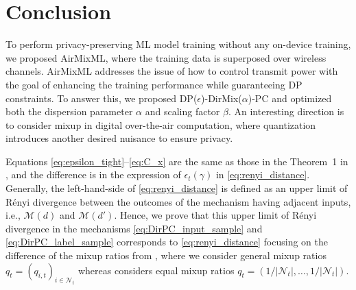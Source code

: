 \documentclass[conference,10pt]{IEEEtran}
\theoremstyle{definition}
\theoremstyle{definition}
\begin{document}



\vspace{-1.4em}
\section{Conclusion}
To perform privacy-preserving ML model training without any on-device training, we proposed AirMixML, where the training data is superposed over wireless channels.
AirMixML addresses the issue of how to control transmit power with the goal of enhancing the training performance while guaranteeing DP constraints.
To answer this, we proposed \textsf{DP($\epsilon$)-DirMix($\alpha$)-PC} and optimized both the dispersion parameter $\alpha$ and scaling factor $\beta$.
An interesting direction is to consider mixup in digital over-the-air computation, where quantization introduces another desired nuisance to ensure privacy.


\vspace{-.6em}
\appendix[]

Equations \eqref{eq:epsilon_tight}--\eqref{eq:C_x} are the same as those in the Theorem~1 in \cite{lee2019synthesizing}, and the difference is in the expression of $\epsilon_t(\gamma)$ in \eqref{eq:renyi_distance}.
Generally, the left-hand-side of \eqref{eq:renyi_distance} is defined as an upper limit of R{\'e}nyi divergence\cite{mironov2017renyi} between the outcomes of the mechanism having adjacent inputs, i.e., $\mathcal{M}(d)$ and $\mathcal{M}(d')$.
Hence, we prove that this upper limit of R{\'e}nyi divergence in the mechanisms \eqref{eq:DirPC_input_sample} and \eqref{eq:DirPC_label_sample} corresponds to \eqref{eq:renyi_distance} focusing on the difference of the mixup ratios from \cite{lee2019synthesizing}, where we consider general mixup ratios $q_t = (q_{i, t})_{i\in\mathcal{N}_t}$  whereas \cite{lee2019synthesizing} considers equal mixup ratios $q_t = (1/|\mathcal{N}_t|,\dots,1/|\mathcal{N}_t|)$.
\end{document}

